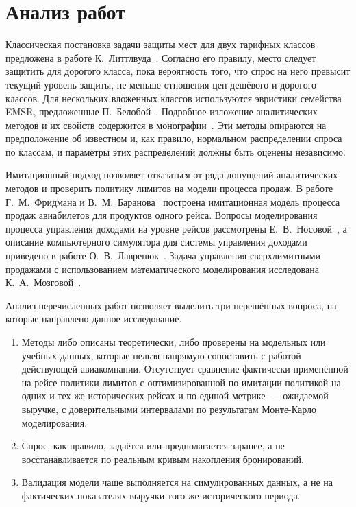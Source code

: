 \documentclass{misisarticle}
\begin{document}
\section{Анализ работ}

Классическая постановка задачи защиты мест для двух тарифных классов предложена в работе К.~Литтлвуда~\cite{littlewood1972}. Согласно его правилу, место следует защитить для дорогого класса, пока вероятность того, что спрос на него превысит текущий уровень защиты, не меньше отношения цен дешёвого и дорогого классов. Для нескольких вложенных классов используются эвристики семейства EMSR, предложенные П.~Белобой~\cite{belobaba1987}. Подробное изложение аналитических методов и их свойств содержится в монографии~\cite{talluri2004}. Эти методы опираются на предположение об известном и, как правило, нормальном распределении спроса по классам, и параметры этих распределений должны быть оценены независимо.

Имитационный подход позволяет отказаться от ряда допущений аналитических методов и проверить политику лимитов на модели процесса продаж. В работе Г.~М.~Фридмана и В.~М.~Баранова~\cite{fridman2025} построена имитационная модель процесса продаж авиабилетов для продуктов одного рейса. Вопросы моделирования процесса управления доходами на уровне рейсов рассмотрены Е.~В.~Носовой~\cite{nosova}, а описание компьютерного симулятора для системы управления доходами приведено в работе О.~В.~Лавренюк~\cite{lavrenyuk}. Задача управления сверхлимитными продажами с использованием математического моделирования исследована К.~А.~Мозговой~\cite{mozgovaya2013}.

Анализ перечисленных работ позволяет выделить три нерешённых вопроса, на которые направлено данное исследование.

\begin{enumerate}[label=\arabic*)]
  \item Методы либо описаны теоретически, либо проверены на модельных или учебных данных, которые нельзя напрямую сопоставить с работой действующей авиакомпании. Отсутствует сравнение фактически применённой на рейсе политики лимитов с оптимизированной по имитации политикой на одних и тех же исторических рейсах и по единой метрике~--- ожидаемой выручке, с доверительными интервалами по результатам Монте-Карло моделирования.
  \item Спрос, как правило, задаётся или предполагается заранее, а не восстанавливается по реальным кривым накопления бронирований.
  \item Валидация модели чаще выполняется на симулированных данных, а не на фактических показателях выручки того же исторического периода.
\end{enumerate}
\end{document}
